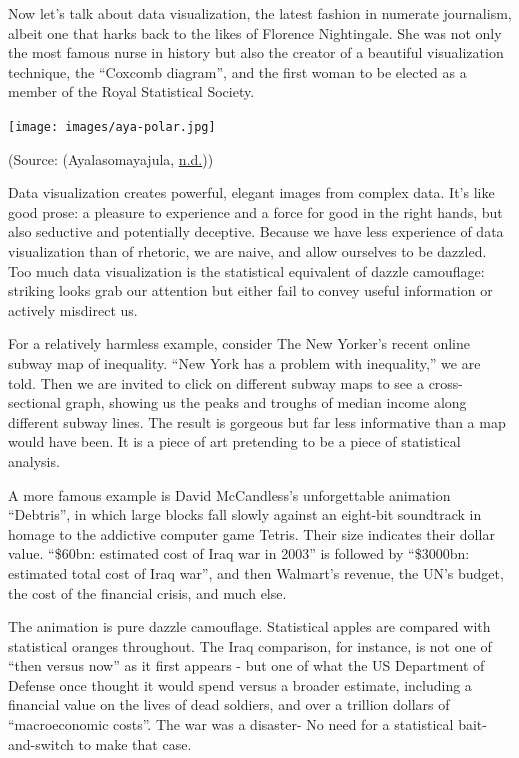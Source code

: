 \documentclass[]{book}
\begin{document}
Now let's talk about data visualization, the latest fashion in numerate journalism, albeit one that harks back to the likes of Florence Nightingale. She was not only the most famous nurse in history but also the creator of a beautiful visualization technique, the ``Coxcomb diagram'', and the first woman to be elected as a member of the Royal Statistical Society.

\texttt{[image: images/aya-polar.jpg]}

(Source: (Ayalasomayajula, \protect\hyperlink{ref-aya-time-series}{n.d.}))

Data visualization creates powerful, elegant images from complex data. It's like good prose: a pleasure to experience and a force for good in the right hands, but also seductive and potentially deceptive. Because we have less experience of data visualization than of rhetoric, we are naive, and allow ourselves to be dazzled. Too much data visualization is the statistical equivalent of dazzle camouflage: striking looks grab our attention but either fail to convey useful information or actively misdirect us.

For a relatively harmless example, consider The New Yorker's recent online subway map of inequality. ``New York has a problem with inequality,'' we are told. Then we are invited to click on different subway maps to see a cross-sectional graph, showing us the peaks and troughs of median income along different subway lines. The result is gorgeous but far less informative than a map would have been. It is a piece of art pretending to be a piece of statistical analysis.

A more famous example is David McCandless's unforgettable animation ``Debtris'', in which large blocks fall slowly against an eight-bit soundtrack in homage to the addictive computer game Tetris. Their size indicates their dollar value. ``\$60bn: estimated cost of Iraq war in 2003'' is followed by ``\$3000bn: estimated total cost of Iraq war'', and then Walmart's revenue, the UN's budget, the cost of the financial crisis, and much else.

The animation is pure dazzle camouflage. Statistical apples are compared with statistical oranges throughout. The Iraq comparison, for instance, is not one of ``then versus now'' as it first appears - but one of what the US Department of Defense once thought it would spend versus a broader estimate, including a financial value on the lives of dead soldiers, and over a trillion dollars of ``macroeconomic costs''. The war was a disaster- No need for a statistical bait-and-switch to make that case.
\end{document}

